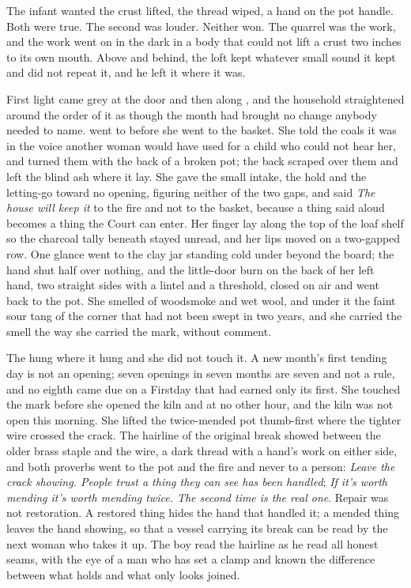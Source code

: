 The infant wanted the crust lifted, the thread wiped, a hand on the pot handle. Both were true. The second was louder. Neither won. The quarrel was the work, and the work went on in the dark in a body that could not lift a crust two inches to its own mouth. Above and behind, the loft kept whatever small sound it kept and did not repeat it, and he left it where it was.

First light came grey at the door and then along , and the household straightened around the order of it as though the month had brought no change anybody needed to name.  went to  before she went to the basket. She told the coals it was  in the voice another woman would have used for a child who could not hear her, and turned them with the back of a broken pot; the back scraped over them and left the blind ash where it lay. She gave the small intake, the hold and the letting-go toward no opening, figuring neither of the two gaps, and said \emph{The house will keep it} to the fire and not to the basket, because a thing said aloud becomes a thing the Court can enter. Her finger lay along the top of the loaf shelf so the charcoal tally beneath stayed unread, and her lips moved on a two-gapped row. One glance went to the clay jar standing cold under  beyond the board; the hand shut half over nothing, and the little-door burn on the back of her left hand, two straight sides with a lintel and a threshold, closed on air and went back to the pot. She smelled of woodsmoke and wet wool, and under it the faint sour tang of the corner that had not been swept in two years, and she carried the smell the way she carried the mark, without comment.

The  hung where it hung and she did not touch it. A new month's first tending day is not an opening; seven openings in seven months are seven and not a rule, and no eighth came due on a Firstday that had earned only its first. She touched the mark before she opened the kiln and at no other hour, and the kiln was not open this morning. She lifted the twice-mended pot thumb-first where the tighter wire crossed the crack. The hairline of the original break showed between the older brass staple and the wire, a dark thread with a hand's work on either side, and both proverbs went to the pot and the fire and never to a person: \emph{Leave the crack showing. People trust a thing they can see has been handled}; \emph{If it's worth mending it's worth mending twice. The second time is the real one}. Repair was not restoration. A restored thing hides the hand that handled it; a mended thing leaves the hand showing, so that a vessel carrying its break can be read by the next woman who takes it up. The boy read the hairline as he read all honest seams, with the eye of a man who has set a clamp and known the difference between what holds and what only looks joined.

